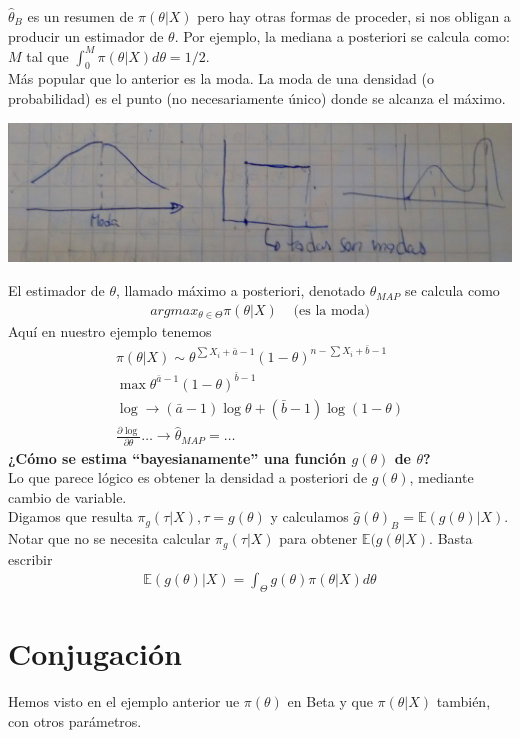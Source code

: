 \documentclass[10pt]{article}
\theoremstyle{plain}
\theoremstyle{definition}
\begin{document}
$\hat{\theta}_{B}$ es un resumen de $\pi(\theta|X)$ pero hay otras formas de proceder, si nos obligan a producir un estimador de $\theta$. Por ejemplo, la mediana a posteriori se calcula como:\\
$M$ tal que $\int_{0}^{M}\pi(\theta|X)d\theta = 1/2$.\\
Más popular que lo anterior es la moda. La moda de una densidad (o probabilidad) es el punto (no necesariamente único) donde se alcanza el máximo.
\begin{center}
\includegraphics[scale=0.1]{imagenes/moda.jpg}
\end{center}
El estimador de $\theta$, llamado máximo a posteriori, denotado $\theta_{MAP}$ se calcula como
\begin{align*}
argmax_{\theta \in \Theta}\pi(\theta|X) & \text{ (es la moda)}
\end{align*}
Aquí en nuestro ejemplo tenemos
\begin{align*}
\pi(\theta|X) \sim \theta^{\sum X_{i} + \bar{a} - 1}(1-\theta)^{n-\sum X_{i} + \bar{b} - 1}\\
\max \theta^{\bar{a}-1}(1-\theta)^{\bar{b}-1}\\
\log \rightarrow (\bar{a}-1)\log \theta + (\bar{b}-1)\log (1-\theta)\\
\frac{\partial \log}{\partial \theta} \ldots \rightarrow \hat{\theta}_{MAP} = \ldots
\end{align*}
\textbf{¿Cómo se estima ``bayesianamente'' una función $g(\theta)$ de $\theta$?}\\
Lo que parece lógico es obtener la densidad a posteriori de $g(\theta)$, mediante cambio de variable.\\
Digamos que resulta $\pi_{g}(\tau|X), \tau = g(\theta)$ y calculamos $\hat{g}(\theta)_{B} = \mathbb{E}(g(\theta)|X)$.\\
Notar que no se necesita calcular $\pi_{g}(\tau|X)$ para obtener $\mathbb{E}(g(\theta|X)$. Basta escribir
\begin{align*}
\mathbb{E}(g(\theta)|X) = \int_{\Theta}g(\theta) \pi(\theta|X)d\theta
\end{align*}
\section{Conjugación}
Hemos visto en el ejemplo anterior ue $\pi(\theta)$ en Beta y que $\pi(\theta|X)$ también, con otros parámetros.\\
\end{document}
